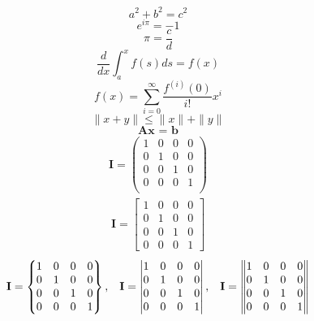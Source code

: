 \documentclass{article}
\begin{document}
\begin{center}
    \begin{equation*}
    a^2 + b^2 = c^2
\end{equation*}
\begin{equation*}
    e^{i\pi} = -1
\end{equation*}
\begin{equation*}
    \pi = \frac{c}{d}
\end{equation*}
\begin{equation*}
    \frac{d}{dx}\int_{a}^{x} f(s)ds = f(x)
\end{equation*}
\begin{equation*}
    f(x) = \sum^\infty_{i=0}\frac{f^{(i)}(0)}{i!}x^i
\end{equation*}
\begin{equation*}
    \parallel{x + y}\parallel {\leq} \parallel{x}\parallel + \parallel{y}\parallel
\end{equation*}
\begin{equation*}
    \textbf{Ax = b}
\end{equation*}
\begin{gather}
\textbf{I} = 
\begin{pmatrix} \label{1}
    1 & 0 & 0 & 0\\
    0 & 1 & 0 & 0\\
    0 & 0 & 1 & 0\\
    0 & 0 & 0 & 1\\
\end{pmatrix}
\end{gather}
\begin{gather}
\textbf{I} = 
\begin{bmatrix}
    1 & 0 & 0 & 0\\
    0 & 1 & 0 & 0\\
    0 & 0 & 1 & 0\\
    0 & 0 & 0 & 1
\end{bmatrix}
\end{gather}
\begin{gather}
\textbf{I} = 
\begin{Bmatrix}
    1 & 0 & 0 & 0\\
    0 & 1 & 0 & 0\\
    0 & 0 & 1 & 0\\
    0 & 0 & 0 & 1
\end{Bmatrix}
,
\hspace{3mm}
\textbf{I} =
\begin{vmatrix}
    1 & 0 & 0 & 0\\
    0 & 1 & 0 & 0\\
    0 & 0 & 1 & 0\\
    0 & 0 & 0 & 1
\end{vmatrix}
,
\hspace{3mm}
\textbf{I} =
\begin{Vmatrix}
    1 & 0 & 0 & 0\\
    0 & 1 & 0 & 0\\
    0 & 0 & 1 & 0\\
    0 & 0 & 0 & 1
\end{Vmatrix}
\end{gather}
\end{center}
\end{document}
